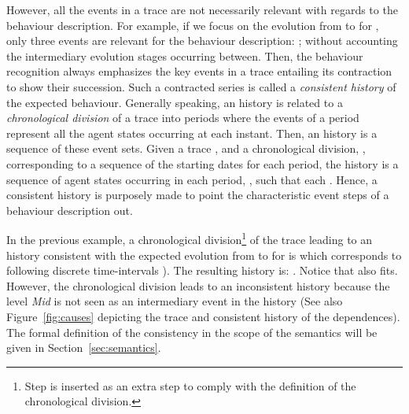 \documentclass{eptcs}
\newcounter{ti}
\begin{document}
However, all the events in a trace are not necessarily relevant with regards to the behaviour description. For example, if we focus on the evolution from  to  for  , only three events are relevant for the behaviour description: ; without accounting the intermediary evolution stages occurring between. Then, the behaviour recognition always emphasizes the key events in a trace entailing its contraction to show their succession. Such a contracted series is called a \emph{consistent history} of the expected behaviour. Generally speaking, an history is related to a \emph{chronological division} of a trace into periods where the events of a period represent all the agent states occurring at each instant.
Then, an history is a sequence of these event sets.
Given a trace , and a chronological division, , corresponding to a sequence of the starting dates for each period, the history is a sequence of agent states occurring in each period, , such that each . Hence, a consistent history is purposely made to point the characteristic event steps of a behaviour description out.

 In the previous example, a chronological division\footnote{Step  is inserted as an extra step to comply with the definition of the chronological division.} of the trace leading to an history consistent with the expected evolution from  to  for  is  which corresponds to following discrete time-intervals ).
The resulting history is: . Notice that  also fits. However, the chronological division  leads to an inconsistent history because the level \textit{Mid} is not seen as an intermediary event in the history (See also Figure~\ref{fig:causes} depicting the trace and consistent history of the dependences). The formal definition of the consistency in the scope of the semantics will be given in Section~\ref{sec:semantics}.
\end{document}
